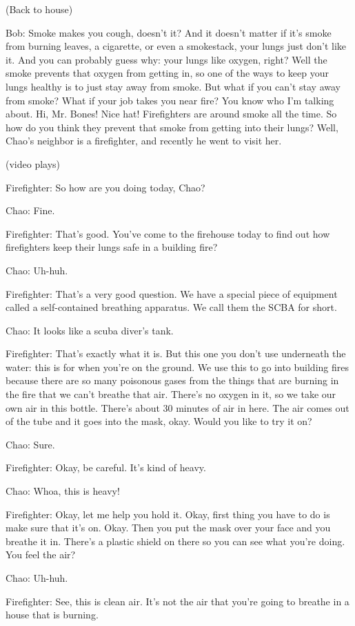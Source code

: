 (Back to house)

Bob: Smoke makes you cough, doesn't it? And it doesn't matter if it's smoke from burning leaves, a cigarette, or even a smokestack, your lungs just don't like it. And you can probably guess why: your lungs like oxygen, right? Well the smoke prevents that oxygen from getting in, so one of the ways to keep your lungs healthy is to just stay away from smoke. But what if you can't stay away from smoke? What if your job takes you near fire? You know who I'm talking about. Hi, Mr. Bones! Nice hat! Firefighters are around smoke all the time. So how do you think they prevent that smoke from getting into their lungs? Well, Chao's neighbor is a firefighter, and recently he went to visit her.

(video plays)

Firefighter: So how are you doing today, Chao?

Chao: Fine.

Firefighter: That's good. You've come to the firehouse today to find out how firefighters keep their lungs safe in a building fire?

Chao: Uh-huh.

Firefighter: That's a very good question. We have a special piece of equipment called a self-contained breathing apparatus. We call them the SCBA for short.

Chao: It looks like a scuba diver's tank.

Firefighter: That's exactly what it is. But this one you don't use underneath the water: this is for when you're on the ground. We use this to go into building fires because there are so many poisonous gases from the things that are burning in the fire that we can't breathe that air. There's no oxygen in it, so we take our own air in this bottle. There's about 30 minutes of air in here. The air comes out of the tube and it goes into the mask, okay. Would you like to try it on?

Chao: Sure.

Firefighter: Okay, be careful. It's kind of heavy.

Chao: Whoa, this is heavy!

Firefighter: Okay, let me help you hold it. Okay, first thing you have to do is make sure that it's on. Okay. Then you put the mask over your face and you breathe it in. There's a plastic shield on there so you can see what you're doing. You feel the air?

Chao: Uh-huh.

Firefighter: See, this is clean air. It's not the air that you're going to breathe in a house that is burning.

